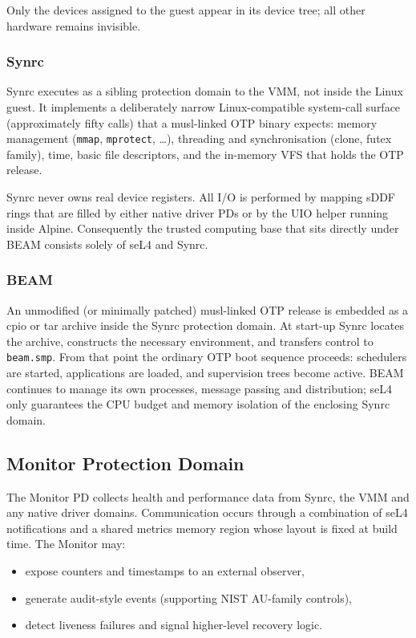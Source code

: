 \documentclass{article}
\begin{document}
Only the devices assigned to the guest appear in its device tree; all other hardware remains invisible.

\subsubsection{Synrc}
\label{sec:synrc}

Synrc executes as a sibling protection domain to the VMM, not inside the Linux guest.
It implements a deliberately narrow Linux-compatible system-call surface (approximately fifty calls)
that a musl-linked OTP binary expects: memory management (\texttt{mmap}, \texttt{mprotect}, \ldots),
threading and synchronisation (clone, futex family), time, basic file descriptors, and the in-memory
VFS that holds the OTP release.

Synrc never owns real device registers. All I/O is performed by mapping sDDF rings that are
filled by either native driver PDs or by the UIO helper running inside Alpine.
Consequently the trusted computing base that sits directly under BEAM consists solely of seL4 and Synrc.

\subsubsection{BEAM}
\label{sec:beam}

An unmodified (or minimally patched) musl-linked OTP release is embedded as a
cpio or tar archive inside the Synrc protection domain. At start-up Synrc locates
the archive, constructs the necessary environment, and transfers control to \texttt{beam.smp}.
From that point the ordinary OTP boot sequence proceeds: schedulers are started,
applications are loaded, and supervision trees become active. BEAM continues to
manage its own processes, message passing and distribution; seL4 only guarantees
the CPU budget and memory isolation of the enclosing Synrc domain.

\subsection{Monitor Protection Domain}
\label{sec:monitor}

The Monitor PD collects health and performance data from Synrc, the VMM and any native driver domains.
Communication occurs through a combination of seL4 notifications and a shared metrics memory
region whose layout is fixed at build time. The Monitor may:

\begin{itemize}
  \item expose counters and timestamps to an external observer,
  \item generate audit-style events (supporting NIST AU-family controls),
  \item detect liveness failures and signal higher-level recovery logic.
\end{itemize}
\end{document}
